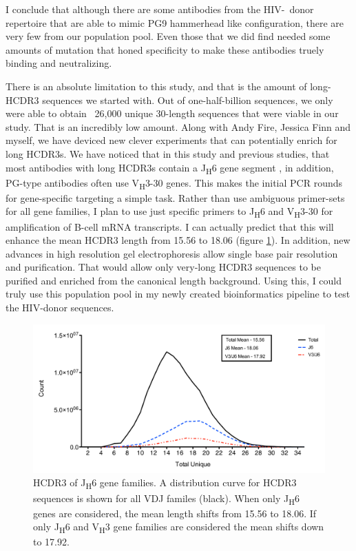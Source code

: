 I conclude that although there are some antibodies from the HIV-\naive~donor repertoire that are able to mimic PG9 hammerhead like configuration, there are very few from our population pool. Even those that we did find needed some amounts of mutation that honed specificity to make these antibodies truely binding and neutralizing.

There is an absolute limitation to this study, and that is the amount of long-HCDR3 sequences we started with. Out of one-half-billion sequences, we only were able to obtain ~26,000 unique 30-length sequences that were viable in our study. That is an incredibly low amount. Along with Andy Fire, Jessica Finn and myself, we have deviced new clever experiments that can potentially enrich for long HCDR3s. We have noticed that in this study and previous studies, that most antibodies with long HCDR3s contain a J\textsubscript{H}6 gene segment \citep{Briney:2012ib}, in addition, PG-type antibodies often use V\textsubscript{H}3-30 genes. This makes the initial PCR rounds for gene-specific targeting a simple task. Rather than use ambiguous primer-sets for all gene families, I plan to use just specific primers to J\textsubscript{H}6 and V\textsubscript{H}3-30 for amplification of B-cell mRNA transcripts. I can actually predict that this will enhance the mean HCDR3 length from 15.56 to 18.06 (figure \ref{fig:fig5_3}). In addition, new advances in high resolution gel electrophoresis allow single base pair resolution and purification. That would allow only very-long HCDR3 sequences to be purified and enriched from the canonical length background. Using this, I could truly use this population pool in my newly created bioinformatics pipeline to test the HIV-\naive donor sequences.

\begin{figure}[!t]
   \centering
   \includegraphics[width=.9\textwidth]{images/chapter5/figure5_3.pdf}
   \caption[HCDR3 of J\textsubscript{H}6 Gene Families]{HCDR3 of J\textsubscript{H}6 gene families. A distribution curve for HCDR3 sequences is shown for all VDJ familes (black). When only J\textsubscript{H}6 genes are considered, the mean length shifts from 15.56 to 18.06. If only J\textsubscript{H}6 and V\textsubscript{H}3 gene families are considered the mean shifts down to 17.92.}
       \label{fig:fig5_3}
\end{figure}

